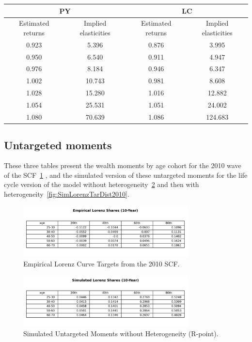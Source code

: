 \begin{center}
\begin{tabular}{|c|c|c|c|}
\hline
\multicolumn{2}{|c|}{PY} & \multicolumn{2}{|c|}{LC} \\
\hline
Estimated returns & Implied elasticities & Estimated returns & Implied elasticities \\
\hline
0.923 & 5.396 & 0.876 & 3.995 \\
0.950 & 6.540 & 0.911 & 4.947 \\
0.976 & 8.184 & 0.946 & 6.347 \\
1.002 & 10.743 & 0.981 & 8.608 \\
1.028 & 15.280 & 1.016 & 12.882 \\
1.054 & 25.531 & 1.051 & 24.002 \\
1.080 & 70.639 & 1.086 & 124.683 \\
\hline
\end{tabular}
\end{center}


\subsection{Untargeted moments}

\par These three tables present the wealth moments by age cohort for the 2010 wave of the SCF~\ref{fig:EmpLorenzTar2010} , and the simulated version of these untargeted moments for the life cycle version of the model without heterogeneity~\ref{fig:SimLorenzTarPoint2010} and then with heterogeneity~\ref{fig:SimLorenzTarDist2010}.

\begin{figure}[h]
\centering
\includegraphics[width=0.8\textwidth]{Tables/Emp_Lorenz_10yr_LCrrDistNetWorth_2010.png}
\caption{Empirical Lorenz Curve Targets from the 2010 SCF.}
\label{fig:EmpLorenzTar2010}
\end{figure}

\begin{figure}[htbp]
\centering
\includegraphics[width=0.8\textwidth]{Tables/Sim_Lorenz_10yr_LCrrPointNetWorth_2010.png}
\caption{Simulated Untargeted Moments without Heterogeneity (R-point).}
\label{fig:SimLorenzTarPoint2010}
\end{figure}

